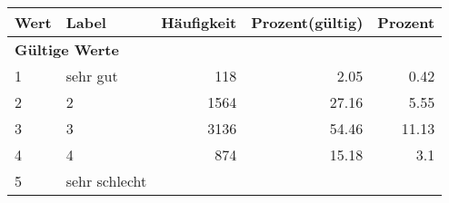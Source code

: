      \begin{longtable}{lXrrr}
     \toprule
     \textbf{Wert} & \textbf{Label} & \textbf{Häufigkeit} & \textbf{Prozent(gültig)} & \textbf{Prozent} \\
     \endhead
     \midrule
     \multicolumn{5}{l}{\textbf{Gültige Werte}}\\

     1 &
     \multicolumn{1}{X}{ sehr gut   } &


       \num{118} &
       \num[round-mode=places,round-precision=2]{2,05} &
         \num[round-mode=places,round-precision=2]{0,42} \\

     2 &
     \multicolumn{1}{X}{ 2   } &


       \num{1564} &
       \num[round-mode=places,round-precision=2]{27,16} &
         \num[round-mode=places,round-precision=2]{5,55} \\

     3 &
     \multicolumn{1}{X}{ 3   } &


       \num{3136} &
       \num[round-mode=places,round-precision=2]{54,46} &
         \num[round-mode=places,round-precision=2]{11,13} \\

     4 &
     \multicolumn{1}{X}{ 4   } &


       \num{874} &
       \num[round-mode=places,round-precision=2]{15,18} &
         \num[round-mode=places,round-precision=2]{3,1} \\

     5 &
     \multicolumn{1}{X}{ sehr schlecht   } &



\end{longtable}
